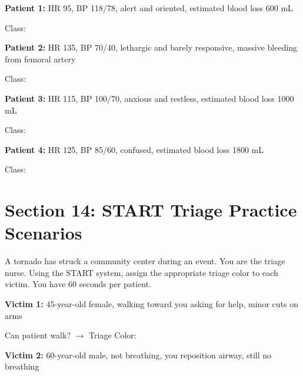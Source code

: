 \documentclass[11pt]{article}
\begin{document}
\textbf{Patient 1:} HR 95, BP 118/78, alert and oriented, estimated blood loss 600 mL

Class: \underline{\hspace{3cm}}

\vspace{0.3cm}

\textbf{Patient 2:} HR 135, BP 70/40, lethargic and barely responsive, massive bleeding from femoral artery

Class: \underline{\hspace{3cm}}

\vspace{0.3cm}

\textbf{Patient 3:} HR 115, BP 100/70, anxious and restless, estimated blood loss 1000 mL

Class: \underline{\hspace{3cm}}

\vspace{0.3cm}

\textbf{Patient 4:} HR 125, BP 85/60, confused, estimated blood loss 1800 mL

Class: \underline{\hspace{3cm}}

\vspace{1cm}

\section*{Section 14: START Triage Practice Scenarios}

\begin{tcolorbox}[colback=green!5!white,colframe=green!75!black,title=Mass Casualty Incident]
A tornado has struck a community center during an event. You are the triage nurse. Using the START system, assign the appropriate triage color to each victim. You have 60 seconds per patient.
\end{tcolorbox}

\textbf{Victim 1:} 45-year-old female, walking toward you asking for help, minor cuts on arms

\hspace{1cm} Can patient walk? \underline{\hspace{2cm}} $\rightarrow$ Triage Color: \underline{\hspace{3cm}}

\vspace{0.5cm}

\textbf{Victim 2:} 60-year-old male, not breathing, you reposition airway, still no breathing
\end{document}
